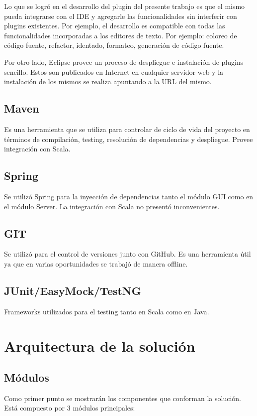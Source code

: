 \documentclass[12pt,a4paper]{article}
\begin{document}
Lo que se logró en el desarrollo del plugin del presente trabajo es que el mismo pueda integrarse con el IDE y agregarle
las funcionalidades sin interferir con plugins existentes. Por ejemplo, el desarrollo es compatible con todas las funcionalidades
incorporadas a los editores de texto. Por ejemplo: coloreo de código fuente, refactor, identado, formateo, generación de código
fuente.

Por otro lado, Eclipse provee un proceso de despliegue e instalación de plugins sencillo. Estos son publicados en Internet en
cualquier servidor web y la instalación de los mismos se realiza apuntando a la URL del mismo.

\subsection{Maven}
Es una herramienta que se utiliza para controlar de ciclo de vida del proyecto en términos de compilación, testing, resolución
de dependencias y despliegue. Provee integración con Scala.

\subsection{Spring}
Se utilizó Spring para la inyección de dependencias tanto el módulo GUI como en el módulo Server. La integración con Scala
no presentó inconvenientes.

\subsection{GIT}
Se utilizó para el control de versiones junto con GitHub. Es una herramienta útil ya que en varias oportunidades se
trabajó de manera offline.

\subsection{JUnit/EasyMock/TestNG}
Frameworks utilizados para el testing tanto en Scala como en Java.

\section{Arquitectura de la solución}

\subsection{Módulos}

Como primer punto se mostrarán los componentes que conforman la solución. Está compuesto por 3 módulos principales:
\end{document}
